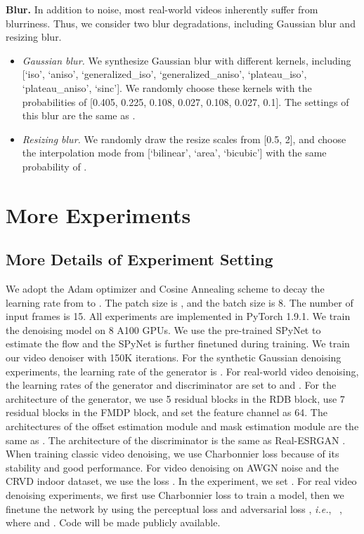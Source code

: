 \documentclass[10pt,twocolumn,letterpaper]{article}
\def\ie{\mbox{\textit{i.e.}, }}
\newlength \g
\begin{document}
\vspace{0.2cm}
\noindent\textbf{Blur.}
In addition to noise, most real-world videos inherently suffer from blurriness.
Thus, we consider two blur degradations, including Gaussian blur and resizing blur.
\begin{itemize}[leftmargin=*]
\item \emph{Gaussian blur.}
    We synthesize Gaussian blur with different kernels, including [`iso', `aniso', `generalized\_iso', `generalized\_aniso', `plateau\_iso', `plateau\_aniso', `sinc'].
    We randomly choose these kernels with the probabilities of [0.405, 0.225, 0.108, 0.027, 0.108, 0.027, 0.1].
    The settings of this blur are the same as \cite{chan2021realbasicvsr}.
    \vspace{-0.1cm}
    \item \emph{Resizing blur.}
    We randomly draw the resize scales from [0.5, 2], and choose the interpolation mode from [`bilinear', `area', `bicubic'] with the same probability of .
\end{itemize}


\section{More Experiments} \label{suppsec:exp}
\vspace{-1mm}
\subsection{More Details of Experiment Setting}
We adopt the Adam optimizer \cite{kingma2014adam} and Cosine Annealing scheme \cite{loshchilov2016sgdr} to decay the learning rate from 
 to .
The patch size is , and the batch size is 8.
The number of input frames is 15. 
All experiments are implemented in PyTorch 1.9.1.
We train the denoising model on 8 A100 GPUs.
We use the pre-trained SPyNet \cite{ranjan2017optical} to  estimate the flow and the SPyNet is further finetuned during training.
We train our video denoiser with 150K iterations.
For the synthetic Gaussian denoising experiments, the learning rate of the generator is .
For real-world video denoising, the learning rates of the generator and discriminator are set to  and .
For the architecture of the generator, we use 5 residual blocks in the RDB block, use 7 residual blocks in the FMDP block, and set the feature channel as 64.
The architectures of the offset estimation module and mask estimation module are the same as \cite{chan2021basicvsrpp}. 
The architecture of the discriminator is the same as Real-ESRGAN \cite{wang2021realesrgan}.
When training classic video denoising, we use Charbonnier loss \cite{charbonnier1994two} because of its stability and good performance.
For video denoising on AWGN noise and the CRVD indoor dataset, we use the loss .
In the experiment, we set .
For real video denoising experiments, we first use Charbonnier loss to train a model, then we finetune the network by using the perceptual loss  \cite{johnson2016perceptual} and adversarial loss  \cite{goodfellow2014gan}, \ie
,
where  and .
Code will be made publicly available.
\end{document}
